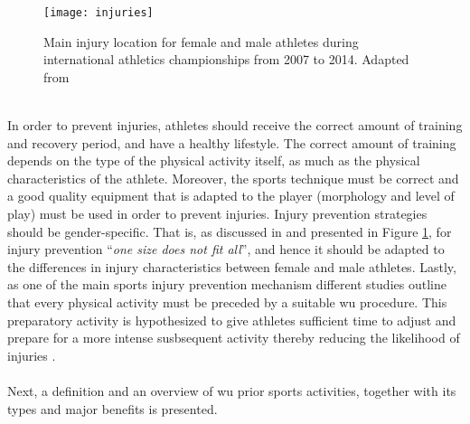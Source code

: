 \begin{figure}[h]
    \centering
    \texttt{[image: injuries]}
    \caption{Main injury location for female and male athletes during
international athletics championships from 2007 to 2014. Adapted from \cite{mayr2015prevention}}
    \label{fig:injuries}
\end{figure}\\
In order to prevent injuries, athletes should receive the correct amount of training and recovery period, and have a healthy lifestyle. The correct amount of training depends on the type of the physical activity itself, as much as the physical characteristics of the athlete. Moreover, the sports technique must be correct and a good quality equipment that is adapted to the player (morphology and level of play) must be used in order to prevent injuries. Injury prevention strategies should be gender-specific. That is, as discussed in \cite{edouard2015sex} and presented in Figure \ref{fig:injuries}, for injury prevention ``\textit{one size does not fit all}'', and hence it should be adapted to the differences in injury characteristics between female and male athletes. Lastly, as one of the main sports injury prevention mechanism different studies outline that every physical activity must be preceded by a suitable \acrshort{wu} procedure. This preparatory activity is hypothesized to give athletes sufficient time to adjust and prepare for a more intense susbsequent activity thereby reducing the likelihood of injuries \cite{mayr2015prevention}.\\\\ Next, a definition and an overview of \acrshort{wu} prior sports activities, together with its types and major benefits is presented.\pagebreak %
